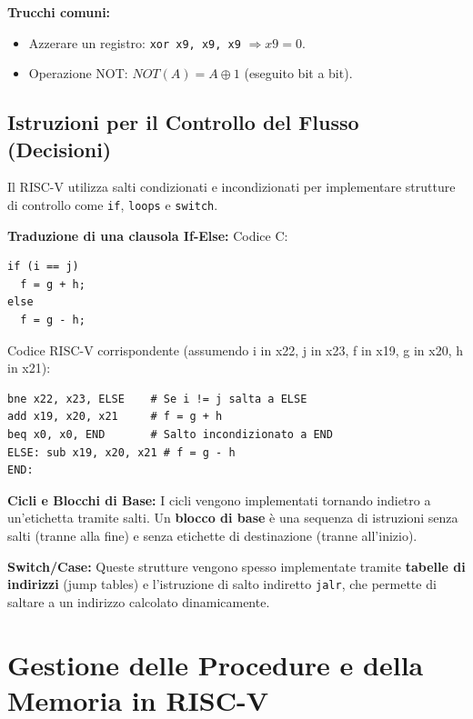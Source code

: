 \documentclass[12pt, a4paper]{article}
\begin{document}
\textbf{Trucchi comuni:}
\begin{itemize}
    \item Azzerare un registro: \texttt{xor x9, x9, x9} $\Rightarrow x9 = 0$.
    \item Operazione NOT: $NOT(A) = A \oplus 1$ (eseguito bit a bit).
\end{itemize}

\subsection{Istruzioni per il Controllo del Flusso (Decisioni)}
Il RISC-V utilizza salti condizionati e incondizionati per implementare strutture di controllo come \texttt{if}, \texttt{loops} e \texttt{switch}.

\textbf{Traduzione di una clausola If-Else:}
Codice C:
\begin{verbatim}
if (i == j)
  f = g + h;
else
  f = g - h;
\end{verbatim}

Codice RISC-V corrispondente (assumendo i in x22, j in x23, f in x19, g in x20, h in x21):
\begin{verbatim}
bne x22, x23, ELSE    # Se i != j salta a ELSE
add x19, x20, x21     # f = g + h
beq x0, x0, END       # Salto incondizionato a END
ELSE: sub x19, x20, x21 # f = g - h
END:
\end{verbatim}

\textbf{Cicli e Blocchi di Base:}
I cicli vengono implementati tornando indietro a un'etichetta tramite salti. Un \textbf{blocco di base} è una sequenza di istruzioni senza salti (tranne alla fine) e senza etichette di destinazione (tranne all'inizio).

\textbf{Switch/Case:}
Queste strutture vengono spesso implementate tramite \textbf{tabelle di indirizzi} (jump tables) e l'istruzione di salto indiretto \texttt{jalr}, che permette di saltare a un indirizzo calcolato dinamicamente.

\section{Gestione delle Procedure e della Memoria in RISC-V}
\end{document}
